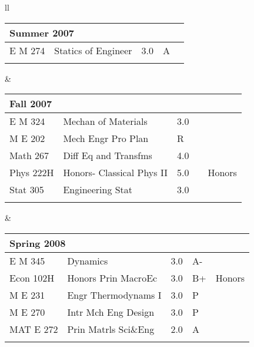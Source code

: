 \documentclass[oneside]{article}
\begin{document}
{\begin{tabular}{ll}
    \begin{tabular}{p{1.5cm} p{3.5cm} p{.3cm} p{.3cm} p{0.75cm}}
      \multicolumn{3}{l}{Summer 2007} & & \\
      \hline
      E M 274 & Statics of Engineer & 3.0 & A\\
      \\
    \end{tabular}
    & 
    \\
  
    \begin{tabular}{p{1.5cm} p{3.5cm} p{.3cm} p{.3cm} p{0.75cm}}
      \multicolumn{5}{l}{Fall 2007}\\
      \hline
      E M 324 & Mechan of Materials & 3.0 & &\\
      M E 202 & Mech Engr Pro Plan & R & &\\
      Math 267 & Diff Eq and Transfms & 4.0 & &\\
      Phys 222H & Honors- Classical Phys II & 5.0 & &Honors\\
      Stat 305 & Engineering Stat & 3.0 & & \\
      \\
    \end{tabular}
    &
    \begin{tabular}{p{1.5cm} p{3.5cm} p{.3cm} p{.3cm} p{0.75cm}}
      \multicolumn{5}{l}{Spring 2008}\\
      \hline
      E M  345 & Dynamics & 3.0 & A- &\\
      Econ 102H & Honors Prin MacroEc & 3.0 & B+ &Honors\\
      M E 231 & Engr Thermodynams I & 3.0 & P&\\
      M E 270 & Intr Mch Eng Design & 3.0 & P&\\
      MAT E 272 & Prin Matrls Sci\&Eng & 2.0 & A&\\
      \\
    \end{tabular}
    \\
  

\end{tabular}}
\end{document}

